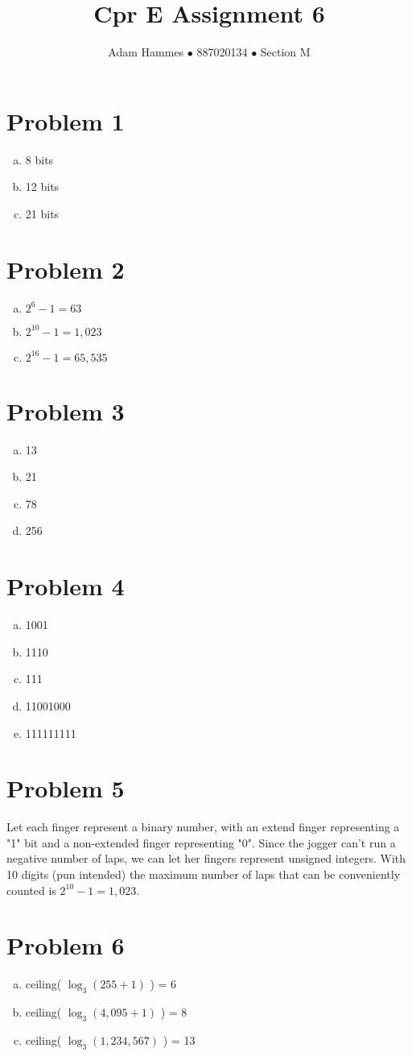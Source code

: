 \documentclass[11pt]{article}
\begin{document}
\title{Cpr E Assignment 6}
\author{Adam Hammes $\bullet$ 887020134 $\bullet$ Section M}
\maketitle

\section*{Problem 1}
\begin{enumerate}[(a)]
	\item 8 bits
	\item 12 bits
	\item 21 bits
\end{enumerate}

\section*{Problem 2}
\begin{enumerate}[(a)]
	\item $2^6 -1 = 63$
	\item $2^{10} -1 = 1,023$
	\item $2^{16}-1 = 65,535$
\end{enumerate}

\section*{Problem 3}
\begin{enumerate}[(a)]
	\item 13
	\item 21
	\item 78
	\item 256
\end{enumerate}

\section*{Problem 4}
\begin{enumerate}[(a)]
	\item 1001
	\item 1110
	\item 111
	\item 11001000
	\item 111111111
\end{enumerate}

\section*{Problem 5}
Let each finger represent a binary number, with an extend finger representing a "1" bit and a non-extended finger representing "0". Since the jogger can't run a negative number of laps, we can let her fingers represent unsigned integers. With 10 digits (pun intended) the maximum number of laps that can be conveniently counted is $2^{10} -1 = 1,023$.

\section*{Problem 6}
\begin{enumerate}[(a)]
	\item ceiling( $\log _3 (255+1)$ ) = 6
	\item ceiling( $\log _3 (4,095+1)$ ) = 8
	\item ceiling( $\log _3 (1,234,567)$ ) = 13
\end{enumerate}
\end{document}
